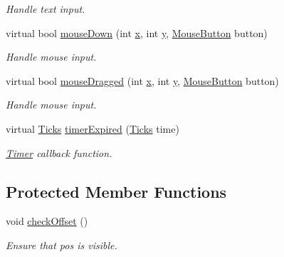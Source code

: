\begin{DoxyCompactItemize}
\begin{DoxyCompactList}\small\item\em Handle text input. \end{DoxyCompactList}\item 
\hypertarget{classGUI_1_1Input_a19a657d7f5526764acab71891fad0f17}{virtual bool \hyperlink{classGUI_1_1Input_a19a657d7f5526764acab71891fad0f17}{mouse\-Down} (int \hyperlink{classGUI_1_1Window_a6ca6a80ca00c9e1d8ceea8d3d99a657d}{x}, int \hyperlink{classGUI_1_1Window_a0ee8e923aff2c3661fc2e17656d37adf}{y}, \hyperlink{namespaceGUI_ad06082a7b02aa73697f39eb8e0856de9}{Mouse\-Button} button)}\label{classGUI_1_1Input_a19a657d7f5526764acab71891fad0f17}

\begin{DoxyCompactList}\small\item\em Handle mouse input. \end{DoxyCompactList}\item 
\hypertarget{classGUI_1_1Input_acb06c8cc98dad0e5ffec6e0fd4b4801d}{virtual bool \hyperlink{classGUI_1_1Input_acb06c8cc98dad0e5ffec6e0fd4b4801d}{mouse\-Dragged} (int \hyperlink{classGUI_1_1Window_a6ca6a80ca00c9e1d8ceea8d3d99a657d}{x}, int \hyperlink{classGUI_1_1Window_a0ee8e923aff2c3661fc2e17656d37adf}{y}, \hyperlink{namespaceGUI_ad06082a7b02aa73697f39eb8e0856de9}{Mouse\-Button} button)}\label{classGUI_1_1Input_acb06c8cc98dad0e5ffec6e0fd4b4801d}

\begin{DoxyCompactList}\small\item\em Handle mouse input. \end{DoxyCompactList}\item 
\hypertarget{classGUI_1_1Input_a71fe106bc0e16593414b5b94cfe2893c}{virtual \hyperlink{namespaceGUI_af396fee5d5c26b98218f5803f85e3b65}{Ticks} \hyperlink{classGUI_1_1Input_a71fe106bc0e16593414b5b94cfe2893c}{timer\-Expired} (\hyperlink{namespaceGUI_af396fee5d5c26b98218f5803f85e3b65}{Ticks} time)}\label{classGUI_1_1Input_a71fe106bc0e16593414b5b94cfe2893c}

\begin{DoxyCompactList}\small\item\em \hyperlink{classGUI_1_1Timer}{Timer} callback function. \end{DoxyCompactList}\end{DoxyCompactItemize}
\subsection*{Protected Member Functions}
\begin{DoxyCompactItemize}
\item 
\hypertarget{classGUI_1_1Input_ab081f47beee40c4872ac7728623b3e82}{void \hyperlink{classGUI_1_1Input_ab081f47beee40c4872ac7728623b3e82}{check\-Offset} ()}\label{classGUI_1_1Input_ab081f47beee40c4872ac7728623b3e82}

\begin{DoxyCompactList}\small\item\em Ensure that pos is visible. \end{DoxyCompactList}\end{DoxyCompactItemize}

